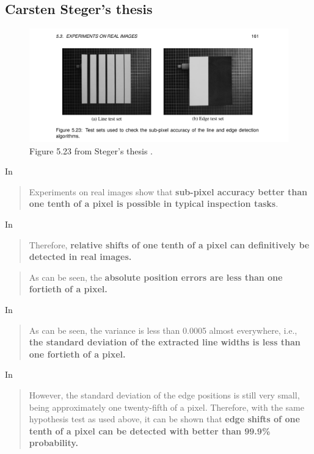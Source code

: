 \documentclass[a4paper,12pt]{article}
\begin{document}
\subsection{Carsten Steger's thesis}

\begin{figure}
  \centering
  \includegraphics[width=\textwidth]{Steger_Thesis_Fig5_23}
  \caption{Figure 5.23 from Steger's thesis \cite{Steger}.}
\end{figure}

In \cite[p.1]{Steger}
\begin{quotation}
Experiments on real images
show that \textbf{sub-pixel accuracy better than one tenth of a pixel is possible in typical inspection
tasks}.
\end{quotation}

In \cite[Section 5.3.2
Sub-Pixel Accuracy of Line Position and Width, p.164]{Steger}
\begin{quotation}
Therefore, \textbf{relative shifts of one tenth of a pixel can definitively be detected
in real images.}
\end{quotation}
\begin{quotation}
As can be seen, the \textbf{absolute position errors are less than
one fortieth of a pixel.}
\end{quotation}

In \cite[Section 5.3.2
Sub-Pixel Accuracy of Line Position and Width, p.165]{Steger}
\begin{quotation}
As can be seen, the variance is less than 0.0005 almost everywhere, i.e., \textbf{the standard
deviation of the extracted line widths is less than one fortieth of a pixel.}
\end{quotation}

In \cite[5.3.3 Sub-Pixel Accuracy of Edge Position, p.166]{Steger}
\begin{quotation}
However, the standard deviation of the edge positions is still very
small, being approximately one twenty-fifth of a pixel. Therefore, with the same hypothesis
test as used above, it can be shown that \textbf{edge shifts of one tenth of a pixel can be detected with
better than 99.9\% probability.}
\end{quotation}
\end{document}
